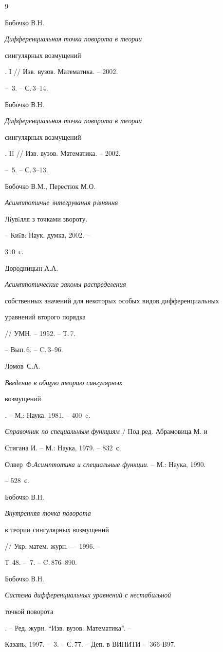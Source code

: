 \begin{thebibliography}{9}







Бобочко В.Н. {\it Дифференциальная точка поворота в теории


сингулярных возмущений}. I // Изв. вузов. Математика. -- 2002.


-- \No\,3. -- С.\,3--14.




Бобочко В.Н. {\it Дифференциальная точка поворота в теории


сингулярных возмущений}. II // Изв. вузов. Математика. -- 2002.


-- \No\,5. -- С.\,3--13.




Бобочко В.М., Перестюк М.О.


{\it Асимптотичне iнтегрування рiвняння


Лiувiлля з точками звороту.} -- Ки$\ddot{\text{\i}}$в: Наук. думка, 2002. --


310~с.




Дородницын А.А. {\it Асимптотические законы распределения


собственных значений для некоторых особых видов дифференциальных


уравнений второго порядка} // УМН. -- 1952. -- Т.\,7.


-- Вып.\,6. -- C.\,3--96.


 Ломов~С.А. {\it Введение в общую теорию сингулярных


возмущений}. -- М.: Наука, 1981. -- 400~c.




{\it Справочник по специальным функциям} / Под ред. Абрамовица М. и


Стигана И. -- М.: Наука, 1979. -- 832~с.




Олвер~Ф.{\it Асимптотика и специальные функции}. -- М.: Наука, 1990.


-- 528~с.


 Бобочко В.Н. {\it Внутренняя точка поворота


в теории сингулярных возмущений} // Укр. матем. журн. --- 1996. --


Т.\,48. -- \No\,7. -- C.\,876--890.




Бобочко В.Н. {\it Система дифференциальных уравнений с нестабильной


точкой поворота}. -- Ред. журн. ``Изв. вузов. Математика''. --


Казань, 1997. -- \No\,3. -- С.\,77. -- Деп. в ВИНИТИ -- \No\,366-B97.





\end{thebibliography}





